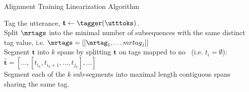 \begin{algorithm}[t]
    \caption{Alignment Training Linearization Algorithm}
    \label{alg:at}
    \DontPrintSemicolon
    Tag the utterance, $\mathbf{t} \gets \tagger(\utttoks)$.  \label{alg:attag} \\
Split $\mrtags$ into the minimal number of subsequences with the same distinct
tag value, i.e. $\mrtags = \left[\left[ \mrtag_1, \ldots mrtag_j \right] \right]$\\
    Segment $\mathbf{t}$ into $k$ spans by splitting $\mathbf{t}$ on tags mapped to no \attributevalue~(i.e. $t_i = \emptyset$): $\boldsymbol{\hat{t}} = \left[\ldots,\left[t_{{i_k}},t_{i_{k}+1},\ldots, t_{j_k}\right],\ldots\right]$ \\
    Segment each of the $k$ sub-segments into maximal length contiguous
    spans sharing the same tag.
\end{algorithm}


